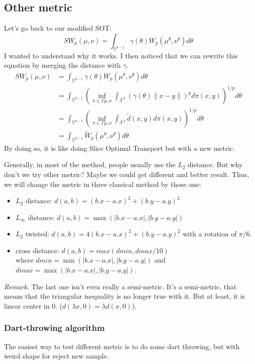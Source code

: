 \documentclass{classeENS}
\begin{document}
\subsection{Other metric}

Let's go back to our modified SOT:
\[SW_p(\mu, \nu) = \int_{\mathbb{S}^{d-1}} \gamma(\theta) W_p(\mu^\theta,\nu^\theta) d\theta\]
I wanted to understand why it works. I then noticed that we can rewrite this equation by merging
the distance with $\gamma$. 
\begin{align*}
    SW_p(\mu, \nu) &= \int_{\mathbb{S}^{d-1}} \gamma(\theta) W_p(\mu^\theta,\nu^\theta) d\theta \\
    &= \int_{\mathbb{S}^{d-1}} \left (\inf_{\pi \in \Gamma{\mu,\nu}} \int_{\mathcal X^2} 
    (\gamma(\theta) \lVert x-y \rVert)^p d\pi(x,y) \right )^{1/p} d\theta \\
    &= \int_{\mathbb{S}^{d-1}} \left (\inf_{\pi \in \Gamma{\mu,\nu}} \int_{\mathcal X^2} 
    \tilde d(x,y) d\pi(x,y) \right )^{1/p} d\theta \\
    &= \int_{\mathbb{S}^{d-1}} \tilde W_p(\mu^\theta,\nu^\theta) d\theta
\end{align*}
By doing so, it is like doing Slice Optimal Transport but with a
new metric.

\> Generally, in most of the method, people usually use the $L_2$ distance. But why don't we
try other metric? Maybe we could get different and better result. Thus, we will change
the metric in three classical method by those one:
    \begin{itemize}
        \item $L_2$ distance: $d(a,b) = (b.x-a.x)^2 + (b.y-a.y)^2$
        \item $L_\infty$ distance: $d(a,b) = \max( |b.x-a.x|, |b.y-a.y|)$
        \item $L_2$ twisted: $d(a,b) = 4(b.x-a.x)^2 + (b.y-a.y)^2$ with a rotation of $\pi/6$.
        \item cross distance: $d(a,b) = max(dmin,dmax/10)$ \\
            where $dmin = \min(|b.x-a.x|, |b.y-a.y|)$ and $dmax = \max(|b.x-a.x|, |b.y-a.y|)$.
    \end{itemize}
\> \textit{Remark}. The last one isn't even really a semi-metric. It's a semi-metric, 
    that means that the triangular inequality is no longer true with it. But at least,
    it is linear center in 0. ($d(\lambda x,0) = \lambda d(x,0)$).

\subsubsection{Dart-throwing algorithm}
    The easiest way to test different metric is to do some dart throwing, but with weird
    shape for reject new sample.
\end{document}

